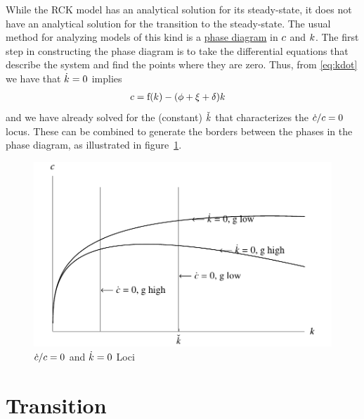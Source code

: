 \documentclass{handout}
\begin{document}
While the RCK model has an analytical solution for its steady-state,
it does not have an analytical solution for the transition to the 
steady-state.  The usual method for analyzing
models of this kind is a \href{https://en.wikipedia.org/wiki/Phase_diagram}{phase diagram} in $c$ and ${k}$.  
The first step in constructing the phase diagram is to take the differential
equations that describe the system and find the points where they are 
zero.  Thus, from \eqref{eq:kdot} we have that $\dot{{k}}=0$ implies
\begin{equation}\begin{gathered}\begin{aligned}
  c & =  \mathrm{f}({k}) - (\phi +\xi+\delta) {k} \label{eq:kdotEq0}
\end{aligned}\end{gathered}\end{equation}
and we have already solved for the (constant) $\check{{k}}$ that characterizes
the $\dot{c}/c=0$ locus.  These can be combined to generate the borders between
the phases in the phase diagram, as illustrated in figure~\ref{fig:RamseySSPlot}.
\begin{figure}
  \caption{$\dot{c}/c =0 $ and $\dot{{k}}=0$ Loci}\label{fig:RamseySSPlot}
  \includegraphics[width=6in]{../Figures/RamseySSPlot}
\end{figure}

\section{Transition}
\end{document}
